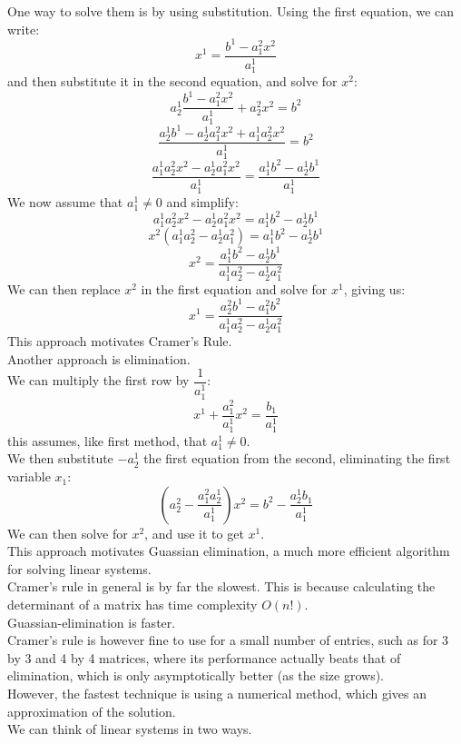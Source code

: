 \documentclass[12pt]{article}
\begin{document}
    One way to solve them is by using substitution.
    Using the first equation, we can write:
    \[ x^1 = \dfrac{b^1 - a_1^2x^2}{a_1^1} \]
    and then substitute it in the second equation,
    and solve for $x^2$:
    \[ a_2^1\dfrac{b^1 - a_1^2x^2}{a_1^1} + a_2^2x^2 = b^2 \]
    \[ \dfrac{a_2^1b^1 - a_2^1a_1^2x^2 
    + a_1^1a_2^2x^2}{a_1^1} = b^2 \]
    \[ \dfrac{a_1^1a_2^2x^2 - a_2^1a_1^2x^2}{a_1^1} = 
    \dfrac{a_1^1b^2 - a_2^1b^1}{a_1^1} \]
    We now assume that $a_1^1 \neq 0$ and simplify:
    \[ a_1^1a_2^2x^2 - a_2^1a_1^2x^2 = 
    a_1^1b^2 - a_2^1b^1 \]
    \[ x^2(a_1^1a_2^2 - a_2^1a_1^2) = 
    a_1^1b^2 - a_2^1b^1 \]
    \[ x^2 = 
    \dfrac{a_1^1b^2 - a_2^1b^1}{a_1^1a_2^2 - a_2^1a_1^2} \]
    We can then replace $x^2$ in the first equation
    and solve for $x^1$, giving us:
    \[ x^1 = 
    \dfrac{a_2^2b^1 - a_1^2b^2}{a_1^1a_2^2 - a_2^1a_1^2} \]
    This approach motivates Cramer's Rule. \\

    Another approach is elimination. \\
    We can multiply the first row by $\dfrac{1}{a_1^1}$:
    \[ x^1 + \dfrac{a_1^2}{a_1^1}x^2 = \dfrac{b_1}{a_1^1} \]
    this assumes, like first method, that $a_1^1 \neq 0$. \\
    We then substitute $-a_2^1$ the first equation
    from the second, eliminating the first variable $x_1$:
    \[ (a_2^2 - \dfrac{a_1^2a_2^1}{a_1^1}) x^2 = 
    b^2 - \dfrac{a_2^1b_1}{a_1^1} \]
    We can then solve for $x^2$,
    and use it to get $x^1$. \\
    This approach motivates Guassian elimination,
    a much more efficient algorithm for solving
    linear systems. \\

    Cramer's rule in general is by far the slowest.
    This is because calculating the determinant of
    a matrix has time complexity $O(n!)$. \\
    Guassian-elimination is faster. \\
    Cramer's rule is however fine to use
    for a small number of entries,
    such as for 3 by 3 and 4 by 4 matrices,
    where its performance actually beats
    that of elimination, which is only asymptotically
    better (as the size grows). \\
    However, the fastest technique is using
    a numerical method, which gives an approximation
    of the solution. \\

    We can think of linear systems in two ways. \\
\end{document}
